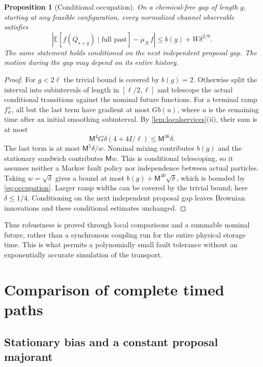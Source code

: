 \documentclass[11pt]{article}
\numberwithin{equation}{section}
\newtheorem{proposition}[theorem]{Proposition}
\theoremstyle{definition}
\theoremstyle{remark}\newtheorem{remark}[theorem]{Remark}
\newcommand{\E}{\mathbb E}
\newcommand{\K}{\mathcal K}
\begin{document}
\begin{proposition}[Conditional occupation]\label{prop:occupation}
On a chemical-free gap of length $g$, starting at any feasible configuration,
every normalized channel observable satisfies
\begin{equation}\label{eq:occupation}
 \left|\E[f(Q_{s+g})\mid\text{full past}]-\mu_\K f\right|
       \le b(g)+W\delta^{2/9}.
\end{equation}
The same statement holds conditioned on the next independent proposal gap.
The motion during the gap may depend on its entire history.
\end{proposition}
\begin{proof}
For $g<2\ell$ the trivial bound is covered by $b(g)=2$. Otherwise split
the interval into subintervals of length in $[\ell/2,\ell]$ and telescope
the actual conditional transitions against the nominal future functions.
For a terminal ramp $f_w^\pm$, all but the last term have gradient at most
$G b(u)$, where $u$ is the remaining time after an initial smoothing
subinterval. By \cref{lem:localservices}(ii), their sum is at most
\[
 \mathsf M^4G\delta(4+4I/\ell)\le\mathsf M^{36}\delta.
\]
The last term is at most $\mathsf M^5\delta/w$.
Nominal mixing contributes $b(g)$ and the stationary sandwich contributes
$\mathsf M w$. This is conditional telescoping, so it assumes neither a
Markov fault policy nor independence between actual particles. Taking
$w=\sqrt\delta$ gives a bound at most
$b(g)+\mathsf M^{40}\sqrt\delta$, which is bounded by
\eqref{eq:occupation}. Larger ramp widths can be covered by the trivial
bound; here $\delta\le1/4$. Conditioning on the next independent proposal
gap leaves Brownian innovations and these conditional estimates unchanged.
\end{proof}

Thus robustness is proved through local comparisons and a summable
nominal future, rather than a synchronous coupling run for the entire
physical storage time. This is what permits a polynomially small fault
tolerance without an exponentially accurate simulation of the transport.



\section{Comparison of complete timed paths}
\label{sec:paths}

\subsection{Stationary bias and a constant proposal majorant}
\end{document}
